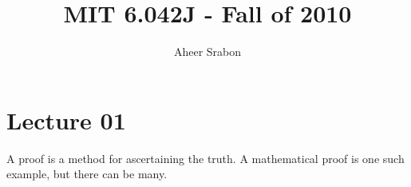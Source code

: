 

\title{MIT 6.042J - Fall of 2010}
\author{Aheer Srabon}


\maketitle

\section{Lecture 01}
\noindent A proof is a method for ascertaining the truth. A mathematical proof
is one such example, but there can be many.

